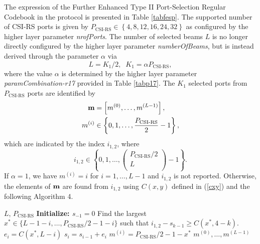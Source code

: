 \documentclass[lettersize,journal]{IEEEtran}
\renewcommand{\algorithmicrequire}{\textbf{Given:}}
\renewcommand{\algorithmicensure}{\textbf{Return:}}
\renewcommand{\algorithmicrequire}{\textbf{Input:}}
\renewcommand{\algorithmicensure}{\textbf{Output:}}
\begin{document}
The expression of the Further Enhanced Type II Port-Selection Regular Codebook in the protocol is presented in Table \ref{tabfesp}. The supported number of CSI-RS ports is given by ${P_{{\text{CSI-RS}}}} \in \left\{ {4,8,12,16,24,32} \right\}$ as configured by the higher layer parameter \emph{nrofPorts}. The number of selected beams $L$ is no longer directly configured by the higher layer parameter \emph{numberOfBeams}, but is instead derived through the parameter $\alpha$ via 
\begin{equation}
    L=K_1/2,\;\;K_1=\alpha P_{\text{CSI-RS}},
\end{equation}
where the value $\alpha$ is determined by the higher layer parameter \emph{paramCombination-r17} provided in Table \ref{tabp17}. The $K_1$ selected ports from $P_{\text{CSI-RS}}$ ports are identified by 
\begin{equation}
\begin{aligned}
{\bf{m}} &= \left[ {{m^{(0)}},\ldots,{m^{(L - 1)}}} \right],\\
{m^{(i)}} &\in \left\{ {0,1,\ldots,\frac{{{P_{\text{CSI-RS}}}}}{2} - 1} \right\},
\end{aligned}
\end{equation}
which are indicated by the index $i_{1,2}$, where
\begin{equation}
  i_{1,2}\in\left\{0,1,\ldots,\left(\begin{matrix}P_{\text{CSI-RS}}/2\\L\\\end{matrix}\right)-1\right\}.
\end{equation}
If $\alpha=1$, we have $m^{(i)}=i$ for $i=1,\ldots,L-1$ and $i_{1,2}$ is not reported. Otherwise, the elements of $\bf{m}$ are found from $i_{1,2}$ using $C(x,y)$ defined in (\ref{cxy}) and the following Algorithm 4.


\renewcommand{\algorithmicrequire}{\textbf{Input:}}
\renewcommand{\algorithmicensure}{\textbf{Output:}}
\begin{algorithm}
\caption{Mapping of $i_{1,2}$ to  ${{m^{(0)}},\ldots,{m^{(L - 1)}}} $}
\label{ciawf}       %
\begin{algorithmic}[1]
\Require  $L$, $P_{\text{CSI-RS}}$
\State \textbf{Initialize:  $s_{-1}=0$ }
\State Find the largest $x^\ast \in \{L-1-i,\ldots,P_{\text{CSI-RS}}/2-1-i\}$ such that $i_{1,2} - {s_{k - 1}} \ge C\left( {{x^*},4 - k} \right)$.
\State ${e_i} = C\left( {{x^*},L - i} \right)$
\State ${s_i} = {s_{i - 1}} + {e_i}$
\State $ m^{(i)}= P_{\text{CSI-RS}}/2-1- {x^*}$
\EndFor
\Ensure ${{m^{(0)}},\ldots,{m^{(L - 1)}}}$
\end{algorithmic}
\end{algorithm}
\end{document}
